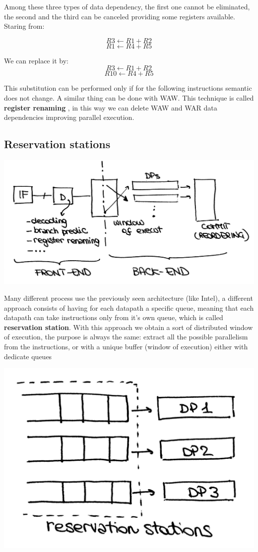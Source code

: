 Among these three types of data dependency, the first one cannot be eliminated, the second and the third can be canceled providing some registers available. Staring from:

$$  R3 \longleftarrow R1+ R2$$
$$  R1 \longleftarrow R4+ R5$$

We can replace it by:
$$R3 \longleftarrow R1+ R2$$
$$R10 \longleftarrow R4+ R5$$

This substitution can be performed only if for the following instructions semantic does not change. A similar thing can be done with WAW. This technique is called \textbf{register renaming} , in this way we can delete WAW and WAR data dependencies improving parallel execution.


\subsection{Reservation stations}
\begin{center}
  \includegraphics[width=0.7\linewidth]{img/img3/4}
\end{center}

Many different process use the previously seen architecture (like Intel), a different approach consists of having for each datapath a specific queue, meaning that each datapath can take instructions only from it's own queue, which is called \textbf{reservation station}. With this approach we obtain a sort of distributed window of execution, the purpose is always the same: extract all the possible parallelism from the instructions, or with a unique buffer (window of execution) either with dedicate queues

\begin{center}
  \includegraphics[width=0.5\linewidth]{img/img3/5}
\end{center}

